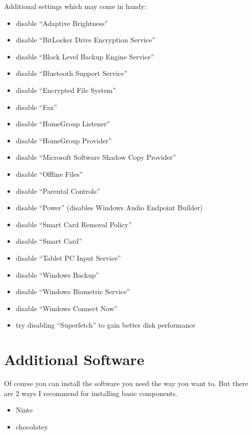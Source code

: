 \documentclass{itsarticle}
\begin{document}
Additional settings which may come in handy:

\begin{itemize}
    \item disable ``Adaptive Brightness''
    \item disable ``BitLocker Drive Encryption Service''
    \item disable ``Block Level Backup Engine Service''
    \item disable ``Bluetooth Support Service''
    \item disable ``Encrypted File System''
    \item disable ``Fax''
    \item disable ``HomeGroup Listener''
    \item disable ``HomeGroup Provider''
    \item disable ``Microsoft Software Shadow Copy Provider''
    \item disable ``Offline Files''
    \item disable ``Parental Controls''
    \item disable ``Power'' (disables Windows Audio Endpoint Builder)
    \item disable ``Smart Card Removal Policy''
    \item disable ``Smart Card''
    \item disable ``Tablet PC Input Service''
    \item disable ``Windows Backup''
    \item disable ``Windows Biometric Service''
    \item disable ``Windows Connect Now''
    \item try disabling ``Superfetch'' to gain better disk performance
\end{itemize}

\section{Additional Software}
\label{sec:software}

Of course you can install the software you need the way you want to. But there
are 2 ways I recommend for installing basic components.

\begin{itemize}
    \item Ninte\footnotemark
    \item chocolatey\footnotemark
\end{itemize}
\end{document}
